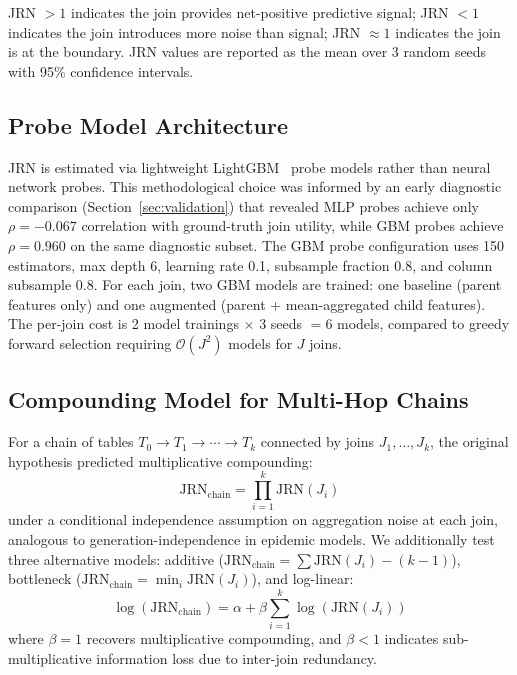 \documentclass[11pt,letterpaper]{article}
\begin{document}
JRN $> 1$ indicates the join provides net-positive predictive signal; JRN $< 1$ indicates the join introduces more noise than signal; JRN $\approx 1$ indicates the join is at the boundary. JRN values are reported as the mean over 3 random seeds with 95\% confidence intervals.

\subsection{Probe Model Architecture}

JRN is estimated via lightweight LightGBM~\citep{Ke2017} probe models rather than neural network probes. This methodological choice was informed by an early diagnostic comparison (Section~\ref{sec:validation}) that revealed MLP probes achieve only $\rho = -0.067$ correlation with ground-truth join utility, while GBM probes achieve $\rho = 0.960$ on the same diagnostic subset. The GBM probe configuration uses 150 estimators, max depth 6, learning rate 0.1, subsample fraction 0.8, and column subsample 0.8. For each join, two GBM models are trained: one baseline (parent features only) and one augmented (parent + mean-aggregated child features). The per-join cost is 2 model trainings $\times$ 3 seeds $= 6$ models, compared to greedy forward selection requiring $\mathcal{O}(J^2)$ models for $J$ joins.

\subsection{Compounding Model for Multi-Hop Chains}

For a chain of tables $T_0 \to T_1 \to \cdots \to T_k$ connected by joins $J_1, \ldots, J_k$, the original hypothesis predicted multiplicative compounding:
\begin{equation}
\text{JRN}_{\text{chain}} = \prod_{i=1}^{k} \text{JRN}(J_i)
\label{eq:multiplicative}
\end{equation}
under a conditional independence assumption on aggregation noise at each join, analogous to generation-independence in epidemic models. We additionally test three alternative models: additive ($\text{JRN}_{\text{chain}} = \sum \text{JRN}(J_i) - (k-1)$), bottleneck ($\text{JRN}_{\text{chain}} = \min_i \text{JRN}(J_i)$), and log-linear:
\begin{equation}
\log(\text{JRN}_{\text{chain}}) = \alpha + \beta \sum_{i=1}^{k} \log(\text{JRN}(J_i))
\label{eq:loglinear}
\end{equation}
where $\beta = 1$ recovers multiplicative compounding, and $\beta < 1$ indicates sub-multiplicative information loss due to inter-join redundancy.
\end{document}

